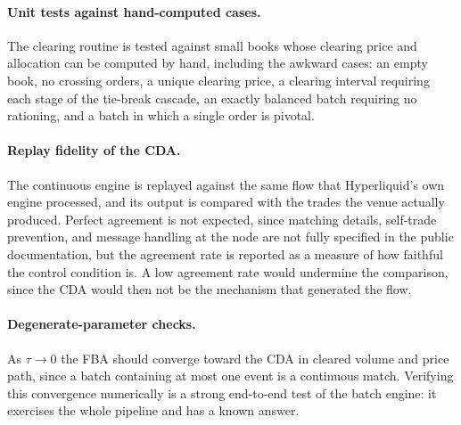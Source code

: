 \paragraph{Unit tests against hand-computed cases.} The clearing routine
is tested against small books whose clearing price and allocation can be
computed by hand, including the awkward cases: an empty book, no
crossing orders, a unique clearing price, a clearing interval requiring
each stage of the tie-break cascade, an exactly balanced batch requiring
no rationing, and a batch in which a single order is pivotal.

\paragraph{Replay fidelity of the CDA.} The continuous engine is
replayed against the same flow that Hyperliquid's own engine processed,
and its output is compared with the trades the venue actually produced.
Perfect agreement is not expected, since matching details, self-trade
prevention, and message handling at the node are not fully specified in
the public documentation, but the agreement rate is reported as a
measure of how faithful the control condition is. A low agreement rate
would undermine the comparison, since the CDA would then not be the
mechanism that generated the flow.

\paragraph{Degenerate-parameter checks.} As $\tau \to 0$ the FBA should
converge toward the CDA in cleared volume and price path, since a batch
containing at most one event is a continuous match. Verifying this
convergence numerically is a strong end-to-end test of the batch
engine: it exercises the whole pipeline and has a known answer.
